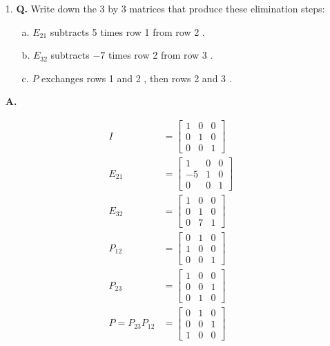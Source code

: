 \documentclass[main.tex]{subfiles}
\begin{document}
    \begin{enumerate}
        \item [1.] \textbf{Q.} Write down the 3 by 3 matrices that produce these elimination steps:
        \begin{enumerate}
            \item [a.] $E_{21}$ subtracts 5 times row 1 from row 2 .
            \item [b.] $E_{32}$ subtracts $-7$ times row 2 from row 3 .
            \item [c.] $P$ exchanges rows 1 and 2 , then rows 2 and 3 .
        \end{enumerate}
        \textbf{A.}
        
        $$
        \begin{aligned}
        I & =\left[\begin{array}{lll}
        1 & 0 & 0 \\
        0 & 1 & 0 \\
        0 & 0 & 1
        \end{array}\right] \\
        E_{21} & = \left[\begin{array}{ccc}
        1 & 0 & 0 \\
        -5 & 1 & 0 \\
        0 & 0 & 1
        \end{array}\right] \\
        E_{32} & =\left[\begin{array}{lll}
        1 & 0 & 0 \\
        0 & 1 & 0 \\
        0 & 7 & 1
        \end{array}\right] \\
        P_{12} & =\left[\begin{array}{lll}
        0 & 1 & 0 \\
        1 & 0 & 0 \\
        0 & 0 & 1
        \end{array}\right] \\
        P_{23} & =\left[\begin{array}{lll}
        1 & 0 & 0 \\
        0 & 0 & 1 \\
        0 & 1 & 0
        \end{array}\right] \\
        P = P_{23} P_{12} & = 
        \left[\begin{array}{lll}
        0 & 1 & 0 \\
        0 & 0 & 1 \\
        1 & 0 & 0
        \end{array}\right]
        \end{aligned}
        $$


\end{enumerate}
\end{document}
